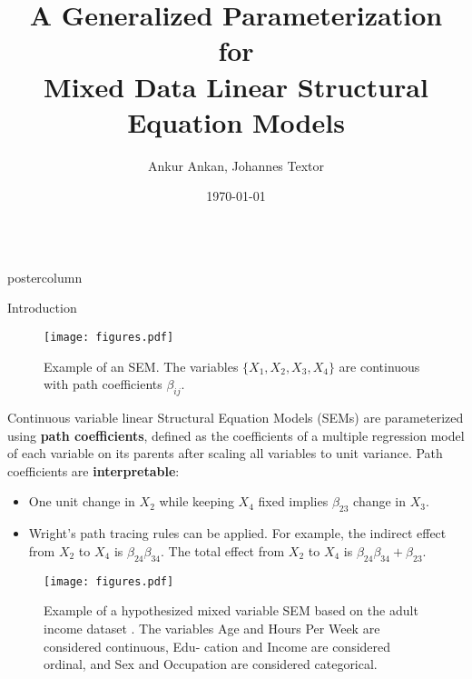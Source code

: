 \documentclass{beamer}
\title{\huge A Generalized Parameterization for \\ Mixed Data Linear Structural Equation Models}
\author{Ankur Ankan, Johannes Textor}
\institute[RU]{Institute for Computing and Information Sciences \\ Radboud University, Netherlands}
\date{\today}
\newlength{\columnheight}
\begin{document}
\begin{frame}
\begin{columns}
	\begin{column}{.33\textwidth}
		\begin{beamercolorbox}[center]{postercolumn}
			\begin{minipage}{.98\textwidth}  %
				\parbox[t][\columnheight]{\textwidth}{ %
	\begin{myblock}{Introduction}
		\begin{figure}
			\texttt{[image: figures.pdf]}
			\label{fig:example_sem}
			\caption{Example of an SEM. The variables $ \{ X_1, X_2, X_3, X_4 \} $ are continuous with path coefficients $ \beta_{ij} $.}
		\end{figure}

		\vspace{1em}
		
		Continuous variable linear Structural Equation Models (SEMs)
		are parameterized using \textbf{path coefficients}, defined as
		the coefficients of a multiple regression model of each
		variable on its parents after scaling all variables to unit
		variance. Path coefficients are \textbf{interpretable}:
		\begin{itemize}
			\item One unit change in $ X_2 $ while keeping $ X_4 $ fixed implies $ \beta_{23} $ change in $ X_3 $. 
			\item Wright's path tracing rules \citep{Wright1934}
				can be applied. For example, the indirect
				effect from $ X_2 $ to $ X_4 $ is $ \beta_{24}
				\beta_{34} $. The total effect from $ X_2 $ to
				$ X_4 $ is $ \beta_{24} \beta_{34} + \beta_{23}
				$.
		\end{itemize}
		\vspace{1em}

		\begin{figure}
			\texttt{[image: figures.pdf]}
			\label{fig:example_adult}
			\caption{Example of a hypothesized mixed variable SEM
				based on the adult income dataset
				\citep{kohavi1996}. The variables Age and Hours
				Per Week are considered continuous, Edu- cation
				and Income are considered ordinal, and Sex and
				Occupation are considered categorical.}
		\end{figure}

		\vspace{1em}


\end{myblock}}
\end{minipage}
\end{beamercolorbox}
\end{column}
\end{columns}
\end{frame}
\end{document}

